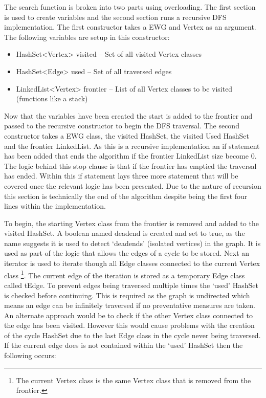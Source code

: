 \documentclass{AISB2008}
\begin{document}
The search function is broken into two parts using overloading. The first section is used to create variables and the second section runs a recursive DFS implementation. The first constructor takes a EWG and Vertex as an argument. 
The following variables are setup in this constructor:

\begin{itemize}
\item HashSet<Vertex> visited – Set of all visited Vertex classes
\item HashSet<Edge> used – Set of all traversed edges
\item LinkedList<Vertex> frontier – List of all Vertex classes to be visited (functions like a stack)
\end{itemize}

Now that the variables have been created the start is added to the frontier and passed to the recursive constructor to begin the DFS traversal. The second constructor takes a EWG class, the visited HashSet, the visited Used HashSet and the frontier LinkedList. As this is a recursive implementation an if statement has been added that ends the algorithm if the frontier LinkedList size become 0. The logic behind this stop clause is that if the frontier has emptied the traversal has ended. Within this if statement lays three more statement that will be covered once the relevant logic has been presented. Due to the nature of recursion this section is technically the end of the algorithm despite being the first four lines within the implementation.

To begin, the starting Vertex class from the frontier is removed and added to the visited HashSet. A boolean named deadend is created and set to true, as the name suggests it is used to detect ‘deadends’ (isolated vertices) in the graph. It is used as part of the logic that allows the edges of a cycle to be stored.  Next an iterator is used to iterate though all Edge classes connected to the current Vertex class  \footnote{The current Vertex class is the same Vertex class that is removed from the frontier.}. The current edge of the iteration is stored as a temporary Edge class called tEdge. To prevent edges being traversed multiple times the ‘used’ HashSet is checked before continuing. This is required as the graph is undirected which means an edge can be infinitely traversed if no preventative measures are taken. An alternate approach would be to check if the other Vertex class connected to the edge has been visited. However this would cause problems with the creation of the cycle HashSet due to the last Edge class in the cycle never being traversed.
If the current edge does is not contained within the ‘used’ HashSet then the following occurs:
\end{document}
